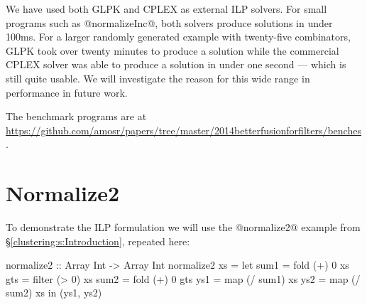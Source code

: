 We have used both GLPK and CPLEX as external ILP solvers. For small programs such as @normalizeInc@, both solvers produce solutions in under 100ms. For a larger randomly generated example with twenty-five combinators, GLPK took over twenty minutes to produce a solution while the commercial CPLEX solver was able to produce a solution in under one second --- which is still quite usable. We will investigate the reason for this wide range in performance in future work.


The benchmark programs are at \url{https://github.com/amosr/papers/tree/master/2014betterfusionforfilters/benches}.



\pagebreak
\section{Normalize2}
To demonstrate the ILP formulation we will use the @normalize2@ example from \S\ref{clustering:s:Introduction}, repeated here:
\begin{code}
  normalize2 :: Array Int -> Array Int
  normalize2 xs
   = let sum1 = fold   (+)  0   xs
         gts  = filter (>   0)  xs
         sum2 = fold   (+)  0   gts
         ys1  = map    (/ sum1) xs
         ys2  = map    (/ sum2) xs
     in (ys1, ys2)
\end{code}

